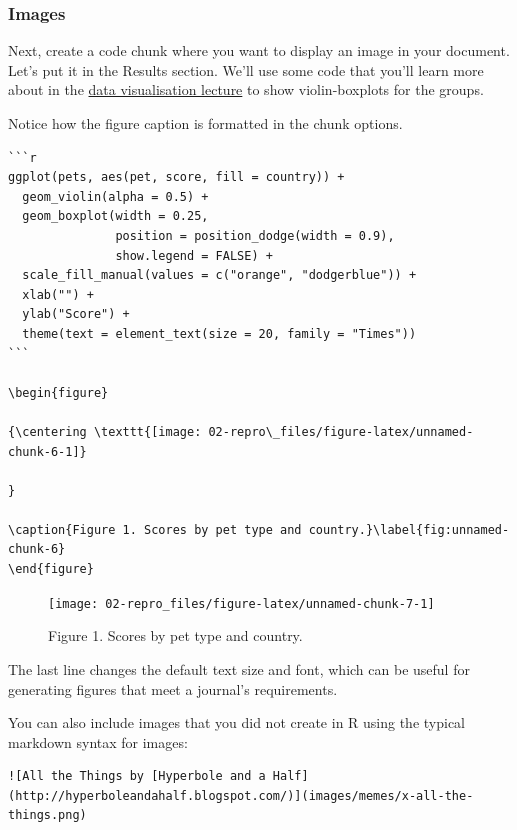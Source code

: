 \documentclass[
  oneside]{book}
\begin{document}
\hypertarget{images}{%
\subsubsection{Images}\label{images}}

Next, create a code chunk where you want to display an image in your document. Let's put it in the Results section. We'll use some code that you'll learn more about in the \protect\hyperlink{ggplot}{data visualisation lecture} to show violin-boxplots for the groups.

Notice how the figure caption is formatted in the chunk options.

\begin{verbatim}
```r
ggplot(pets, aes(pet, score, fill = country)) +
  geom_violin(alpha = 0.5) +
  geom_boxplot(width = 0.25, 
               position = position_dodge(width = 0.9),
               show.legend = FALSE) +
  scale_fill_manual(values = c("orange", "dodgerblue")) +
  xlab("") +
  ylab("Score") +
  theme(text = element_text(size = 20, family = "Times"))
```

\begin{figure}

{\centering \texttt{[image: 02-repro\_files/figure-latex/unnamed-chunk-6-1]} 

}

\caption{Figure 1. Scores by pet type and country.}\label{fig:unnamed-chunk-6}
\end{figure}
\end{verbatim}

\begin{figure}

{\centering \texttt{[image: 02-repro\_files/figure-latex/unnamed-chunk-7-1]} 

}

\caption{Figure 1. Scores by pet type and country.}\label{fig:unnamed-chunk-7}
\end{figure}

\begin{info}
The last line changes the default text size and font, which can be useful for generating figures that meet a journal's requirements.

\end{info}

You can also include images that you did not create in R using the typical markdown syntax for images:

\begin{verbatim}
![All the Things by [Hyperbole and a Half](http://hyperboleandahalf.blogspot.com/)](images/memes/x-all-the-things.png)
\end{verbatim}
\end{document}
